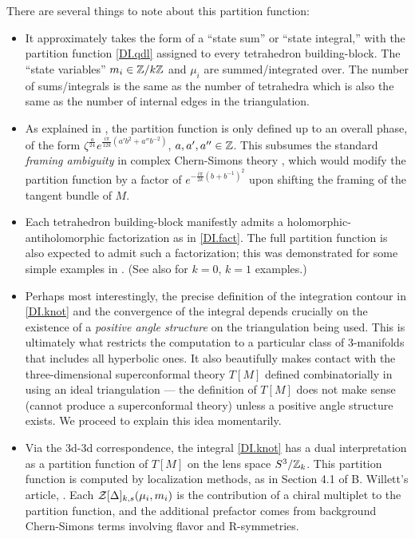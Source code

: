 \documentclass[12pt]{article}
\begin{document}
There are several things to note about this partition function:
\begin{itemize}
\item It approximately takes the form of a ``state sum'' or ``state integral,'' with the partition function \eqref{DI.qdl} assigned to every tetrahedron building-block. The ``state variables''  $m_i\in {\mathbb Z}/k{\mathbb Z}$ and $\mu_i$ are summed/integrated over. The number of sums/integrals is the same as the number of tetrahedra which is also the same as the number of internal edges in the triangulation.

\item As explained in \cite{DID-levelk,DIDG-levelk}, the partition function is only defined up to an overall phase, of the form $\zeta^{\frac a{24}}e^{\frac{i\pi}{12k}(a'b^2+a''b^{-2})}$, $a,a',a''\in {\mathbb Z}$. This subsumes the standard \emph{framing ambiguity} in complex Chern-Simons theory \cite{DIWitten-cx}, which would modify the partition function by a factor of $e^{-\frac{i\pi}{2k}(b+b^{-1})^2}$ upon shifting the framing of the tangent bundle of $M$.

\item Each tetrahedron building-block manifestly admits a holomorphic-antiholomorphic factorization as in \eqref{DI.fact}. The full partition function is also expected to admit such a factorization; this was demonstrated for some simple examples in \cite{DID-levelk}. (See also \cite{DIBDP-blocks, DIGK-Gg} for $k=0$, $k=1$ examples.)

\item Perhaps most interestingly, the precise definition of the integration contour in \eqref{DI.knot} and the convergence of the integral depends crucially on the existence of a \emph{positive angle structure} on the triangulation being used. This is ultimately what restricts the computation to a particular class of 3-manifolds that includes all hyperbolic ones. It also beautifully makes contact with the three-dimensional superconformal theory $T[M]$ defined combinatorially in \cite{DIDGG} using an ideal triangulation --- the definition of $T[M]$ does not make sense (cannot produce a superconformal theory) unless a positive angle structure exists. We proceed to explain this idea momentarily.

\item Via the 3d-3d correspondence, the integral \eqref{DI.knot} has a dual interpretation as a partition function of $T[M]$ on the lens space $S^3/{\mathbb Z}_k$. This partition function is computed by localization methods, as in Section 4.1 of B. Willett's article, . Each $\mathcal{Z}[\Delta]_{k,s}(\mu_i,m_i)$ is the contribution of a chiral multiplet to the partition function, and the additional prefactor comes from background Chern-Simons terms involving flavor and R-symmetries.


\end{itemize}
\end{document}
